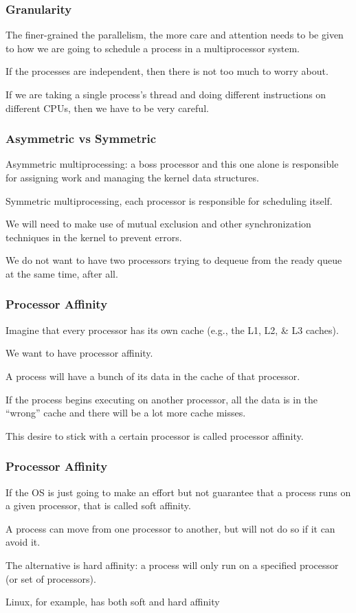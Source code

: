 \begin{frame}
\frametitle{Granularity}

The finer-grained the parallelism, the more care and attention needs to be given to how we are going to schedule a process in a multiprocessor system. 

If the processes are independent, then there is not too much to worry about. 

If we are taking a single process's thread and doing different instructions on different CPUs, then we have to be very careful.

\end{frame}

\begin{frame}
\frametitle{Asymmetric vs Symmetric}
Asymmetric multiprocessing: a boss processor and this one alone is responsible for assigning work and managing the kernel data structures. 

Symmetric multiprocessing, each processor is responsible for scheduling itself. 

We will need to make use of mutual exclusion and other synchronization techniques in the kernel to prevent errors.

We do not want to have two processors trying to dequeue from the ready queue at the same time, after all.

\end{frame}

\begin{frame}
\frametitle{Processor Affinity}

Imagine that every processor has its own cache (e.g., the L1, L2, \& L3 caches).

We want to have \alert{processor affinity}. 

A process will have a bunch of its data in the cache of that processor. 

If the process begins executing on another processor, all the data is in the ``wrong'' cache and there will be a lot more cache misses. 

This desire to stick with a certain processor is called processor affinity.


\end{frame}

\begin{frame}
\frametitle{Processor Affinity}

If the OS is just going to make an effort but not guarantee that a process runs on a given processor, that is called \alert{soft affinity}. 

A process can move from one processor to another, but will not do so if it can avoid it. 

The alternative is \alert{hard affinity}: a process will only run on a specified processor (or set of processors). 

Linux, for example, has both soft and hard affinity

\end{frame}

